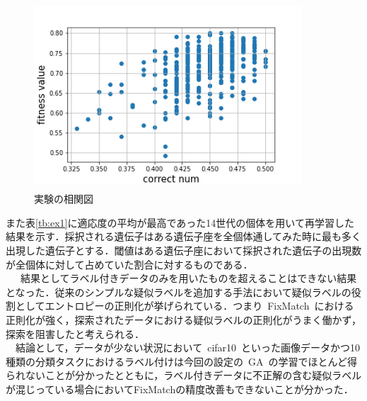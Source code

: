 \documentclass[twocolumn]{jarticle}     %
\begin{document}
\begin{figure}[h]
	\begin{center}
		\vspace*{-3mm}
		\hspace*{-8mm}
		\includegraphics[height=70mm,width=100mm]{img.png}
		\caption{実験の相関図\label{fig:ex1_1}}
	\end{center}
\end{figure}
また表\ref{tb:ex1}に適応度の平均が最高であった14世代の個体を用いて再学習した結果を示す．採択される遺伝子はある遺伝子座を全個体通してみた時に最も多く出現した遺伝子とする．閾値はある遺伝子座において採択された遺伝子の出現数が全個体に対して占めていた割合に対するものである．\\
\ \ \ 結果としてラベル付きデータのみを用いたものを超えることはできない結果となった．従来のシンプルな疑似ラベルを追加する手法\cite{lee2013pseudo}において疑似ラベルの役割としてエントロピーの正則化が挙げられている．つまり\ FixMatch\ における正則化が強く，探索されたデータにおける疑似ラベルの正則化がうまく働かず，探索を阻害したと考えられる．\\
\ \ 結論として，データが少ない状況において\ cifar10\ といった画像データかつ10種類の分類タスクにおけるラベル付けは今回の設定の\ GA\ の学習でほとんど得られないことが分かったとともに，ラベル付きデータに不正解の含む疑似ラベルが混じっている場合においてFixMatchの精度改善もできないことが分かった．

\begin{table}[h]
	\centering
	\caption{GA\ の設定\label{tb:ex1}}
\end{table}
\end{document}
